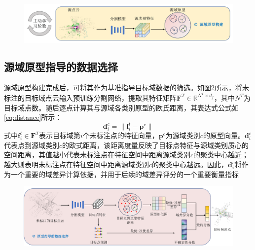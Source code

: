 \vspace{-0.1cm}
\begin{figure}[h]
    \centering
    \includegraphics[width = \textwidth]{ljx/figure/3-2.pdf}
    \label{fig:3-2}
\end{figure}
\vspace{-0.35cm}


\subsection{源域原型指导的数据选择}
源域原型构建完成后，可将其作为基准指导目标域数据的筛选。如图\ref{fig:3-3}所示，将未标注的目标域点云输入预训练分割网络，提取其特征矩阵\( \mathbf{F}^T \in \mathbb{R}^{N^T \times d_f} \)，其中\(N^T\)为目标域点数。随后逐点计算其与源域各类别原型的欧氏距离，其表达式公式如\eqref{eq:distance}所示：
\begin{equation}
    \label{eq:distance}
    \mathbf{d}_i^c = \| \mathbf{f}_i^t - \mathbf{p}^c \|
\end{equation}
式中\( \mathbf{f}_i^t \in \mathbf{F}^T \)表示目标域第\( i \)个未标注点的特征向量，\(\mathbf{p}^c\)为源域类别\(c\)的原型向量。\( \mathbf{d}_i^c \)代表点到源域类别\(c\)的欧式距离，该距离度量反映了目标点特征与源域类别质心的空间距离，其值越小代表未标注点在特征空间中距离源域类别\( c \)的聚类中心越近；越大则表明未标注点在特征空间中距离源域类别\( c \)的聚类中心越远。因此，$\mathbf{d}_i^c$将作为一个重要的域差异计算依据，并用于后续的域差异评分的一个重要衡量指标

\begin{figure}[H]
    \vspace{-0.2cm}
    \centering
    \includegraphics[width = \textwidth]{ljx/figure/3-3.pdf}
    \label{fig:3-3}
    \vspace{-0.45cm}
\end{figure}

